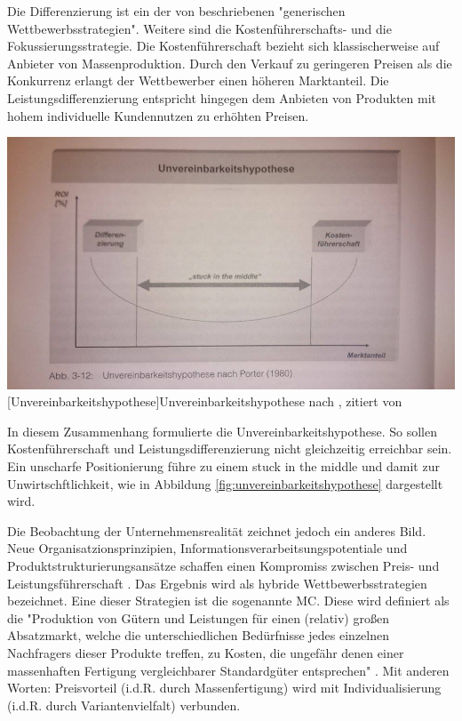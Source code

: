 \documentclass[12pt,a4paper,bibliography=totocnumbered,listof=totoc]{scrartcl}
\begin{document}
Die Differenzierung ist ein der von \citeauthor{porter02} beschriebenen "generischen Wettbewerbsstrategien". Weitere sind die Kostenführerschafts- und die Fokussierungsstrategie.  Die Kostenführerschaft bezieht sich klassischerweise auf Anbieter von Massenproduktion. Durch den Verkauf zu geringeren Preisen als die Konkurrenz erlangt der Wettbewerber einen höheren Marktanteil. Die Leistungsdifferenzierung entspricht hingegen dem Anbieten von Produkten mit hohem individuelle Kundennutzen zu erhöhten Preisen.

\vspace{1em}
\begin{minipage}{\linewidth}
	\centering
	\includegraphics[width=0.7\linewidth]{Abbildungen/unvereinbarkeitshypothese.jpg}
	[Unvereinbarkeitshypothese]{Unvereinbarkeitshypothese nach \cite{porter80}, zitiert von \cite{schuh05}}
	\label{fig:unvereinbarkeitshypothese}
\end{minipage}
\vspace{1em}


In diesem Zusammenhang formulierte \citeauthor{porter80} die Unvereinbarkeitshypothese. So sollen Kostenführerschaft und Leistungsdifferenzierung nicht gleichzeitig erreichbar sein. Ein unscharfe Positionierung führe zu einem \glqq stuck in the middle\grqq{} und damit zur Unwirtschftlichkeit, wie in Abbildung \ref{fig:unvereinbarkeitshypothese} dargestellt wird.

Die Beobachtung der Unternehmensrealität zeichnet jedoch ein anderes Bild. Neue Organisatzionsprinzipien, Informationsverarbeitsungspotentiale und Produktstrukturierungsansätze schaffen einen Kompromiss zwischen Preis- und Leistungsführerschaft \citep{schuh05}. Das Ergebnis wird als hybride Wettbewerbsstrategien bezeichnet. Eine dieser Strategien ist die sogenannte \ac{MC}.  Diese wird definiert als die "Produktion von Gütern und Leistungen für einen (relativ) großen Absatzmarkt, welche die unterschiedlichen Bedürfnisse jedes einzelnen Nachfragers dieser Produkte treffen, zu Kosten, die ungefähr denen einer massenhaften Fertigung vergleichbarer Standardgüter entsprechen"  \citep{piller98}. Mit anderen Worten: Preisvorteil (i.d.R. durch Massenfertigung) wird mit Individualisierung (i.d.R. durch Variantenvielfalt) verbunden.
\end{document}
